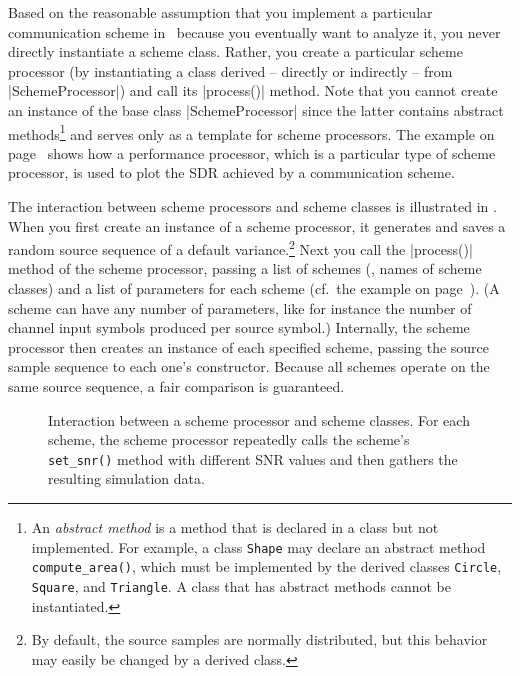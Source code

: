 Based on the reasonable assumption that you implement a particular
communication scheme in \jscsim\ because you eventually want to analyze it, you never directly instantiate a scheme class. Rather, you create a
particular scheme processor (by instantiating a class derived -- directly or
indirectly -- from |SchemeProcessor|) and call its |process()| method. Note that
you cannot create an instance of the base class |SchemeProcessor| since the
latter contains abstract methods\footnote{An \emph{abstract method} is a
method that is declared in a class but not implemented. For example, a class
\texttt{Shape} may declare an abstract method \texttt{compute\_area()}, which
must be implemented by the derived classes \texttt{Circle}, \texttt{Square}, and
\texttt{Triangle}. A class that has abstract methods cannot be instantiated.}
and serves only as a template for scheme processors. The
example on page~\pageref{sec:perfanalysis} shows how a performance processor,
which is a particular type of scheme processor, is used to plot the
SDR achieved by a communication scheme.

The interaction between scheme processors and scheme classes is illustrated in
.  When you first create an instance of a scheme
processor, it generates and saves a random source sequence of a default
variance.\footnote{By default, the source samples are normally distributed, but
this behavior may easily be changed by a derived class.} Next you call the
|process()| method of the scheme processor, passing a list of schemes (\ie,
names of scheme classes) and a list of parameters for each scheme (cf.~the
example on page~\pageref{sec:perfanalysis}). (A scheme can have any number of
parameters, like for instance the number of channel input symbols produced per
source symbol.) Internally, the scheme processor then creates an instance of
each specified scheme, passing the source sample sequence to each one's
constructor. Because all schemes operate on the same source sequence, a fair
comparison is guaranteed. 

\begin{figure}
  \begin{center}
    
  \end{center}
  \caption{Interaction between a scheme processor and scheme classes. For each
  scheme, the scheme processor repeatedly calls the scheme's \texttt{set\_snr()}
  method with different SNR values and then gathers the resulting simulation
  data.}
  \label{fig:schemeprocinteraction}
\end{figure}

